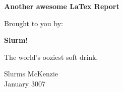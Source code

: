 \thispagestyle{empty} 	%

\begin{center}


\vspace*{7cm}

\huge{\textbf{Another awesome LaTex Report}}

\vspace{1.5cm}

\Large Brought to you by:

\vspace{0.7cm}

\huge{\textbf{Slurm!}}

\vspace{0.7cm}

\Large The world's ooziest soft drink.

\vfill

\Large Slurms McKenzie
\\ %
\Large January 3007


\end{center}

